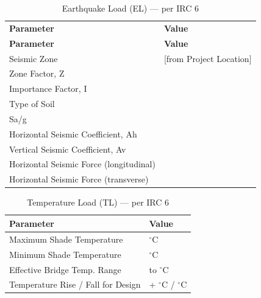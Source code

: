 \documentclass[12pt,a4paper]{report}
\numberwithin{figure}{chapter}
\begin{document}
\vspace{1em}
\begin{longtable}{|L{6.22cm}|L{8.36cm}|}
\caption{Earthquake Load (EL) --- per IRC 6}\\
\hline
\textbf{Parameter} & \textbf{Value} \\
\hline
\endfirsthead
\hline
\textbf{Parameter} & \textbf{Value} \\
\hline
\endhead
Seismic Zone &  [from Project Location] \\
\hline
Zone Factor, Z &  \\
\hline
Importance Factor, I &  \\
\hline
Type of Soil &  \\
\hline
Sa/g &  \\
\hline
Horizontal Seismic Coefficient, Ah &  \\
\hline
Vertical Seismic Coefficient, Av &  \\
\hline
Horizontal Seismic Force (longitudinal) &  \\
\hline
Horizontal Seismic Force (transverse) &  \\
\hline
\end{longtable}

\vspace{1em}
\begin{table}[H]
\centering
{}
\caption{Temperature Load (TL) --- per IRC 6}
\begin{tabular}{|L{6.22cm}|L{8.36cm}|}
\hline
\textbf{Parameter} & \textbf{Value} \\
\hline
Maximum Shade Temperature &  $^\circ$C \\
\hline
Minimum Shade Temperature &  $^\circ$C \\
\hline
Effective Bridge Temp. Range &  to  $^\circ$C \\
\hline
Temperature Rise / Fall for Design & + $^\circ$C / \textminus{} $^\circ$C \\
\hline
\end{tabular}
\end{table}
\end{document}
